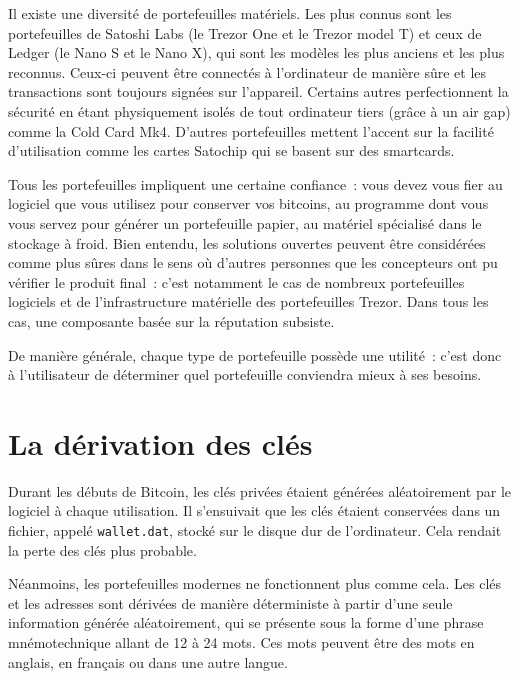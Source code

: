 Il existe une diversité de portefeuilles matériels. Les plus connus sont les portefeuilles de Satoshi Labs (le Trezor One et le Trezor model T) et ceux de Ledger (le Nano S et le Nano X), qui sont les modèles les plus anciens et les plus reconnus. Ceux-ci peuvent être connectés à l'ordinateur de manière sûre et les transactions sont toujours signées sur l'appareil. Certains autres perfectionnent la sécurité en étant physiquement isolés de tout ordinateur tiers (grâce à un air gap) comme la Cold Card Mk4. D'autres portefeuilles mettent l'accent sur la facilité d'utilisation comme les cartes Satochip qui se basent sur des smartcards.

Tous les portefeuilles impliquent une certaine confiance~: vous devez vous fier au logiciel que vous utilisez pour conserver vos bitcoins, au programme dont vous vous servez pour générer un portefeuille papier, au matériel spécialisé dans le stockage à froid. Bien entendu, les solutions ouvertes peuvent être considérées comme plus sûres dans le sens où d'autres personnes que les concepteurs ont pu vérifier le produit final~: c'est notamment le cas de nombreux portefeuilles logiciels et de l'infrastructure matérielle des portefeuilles Trezor. Dans tous les cas, une composante basée sur la réputation subsiste.

De manière générale, chaque type de portefeuille possède une utilité~: c'est donc à l'utilisateur de déterminer quel portefeuille conviendra mieux à ses besoins.

\section*{La dérivation des clés}


Durant les débuts de Bitcoin, les clés privées étaient générées aléatoirement par le logiciel à chaque utilisation. Il s'ensuivait que les clés étaient conservées dans un fichier, appelé \texttt{wallet.dat}, stocké sur le disque dur de l'ordinateur. Cela rendait la perte des clés plus probable.

Néanmoins, les portefeuilles modernes ne fonctionnent plus comme cela. Les clés et les adresses sont dérivées de manière déterministe à partir d'une seule information générée aléatoirement, qui se présente sous la forme d'une phrase mnémotechnique allant de 12 à 24 mots. Ces mots peuvent être des mots en anglais, en français ou dans une autre langue.

